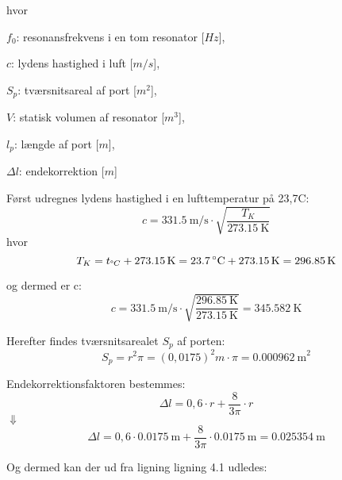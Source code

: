 hvor 
\begin{description}[align=left,labelindent=0.3cm]
\item $f_{0}$: resonansfrekvens i en tom resonator [$Hz$],\\
\item $c$: lydens hastighed i luft [$m/s$],\\
\item $S_{p}$: tværsnitsareal af port [$m^2$],\\
\item $V$: statisk volumen af resonator [$m^3$],\\
\item $l_{p}$: længde af port [$m$],\\
\item $\Delta l$: endekorrektion [$m$]\\
\end{description}

Først udregnes lydens hastighed i en lufttemperatur på 23,7\degree C:
\begin{equation}
		c = {\SI{331,5}{\meter / \second}} \cdot \sqrt{\frac{T_{K}}{\SI{273,15}{\kelvin}}}	\end{equation}
 hvor 		
\begin{equation}
		T_{K} = t_{\degree C} + {\SI{273,15}{\kelvin}} = {\SI{23,7}{\degree C}} + {\SI{273,15}{\kelvin}} = {\SI{296,85}{\kelvin}}	
\end{equation}

og dermed er c: 
\begin{equation}
		c = {\SI{331,5}{\meter / \second}} \cdot \sqrt{\frac{\SI{296,85}{\kelvin}}{\SI{273,15}{\kelvin}}} = {\SI{345,582}{\kelvin}}	\end{equation}
		
Herefter findes tværsnitsarealet $S_{p}$ af porten:
\begin{equation}
		S_{p} = r^2\pi = (0,0175)^2 m \cdot \pi	= {\SI{0,000962}{\meter}^2}
\end{equation}

Endekorrektionsfaktoren bestemmes: 
\begin{equation}
		\Delta l = 0,6 \cdot r + \frac{8}{3\pi} \cdot r 
\end{equation} 
$\Downarrow$
\begin{equation}
\Delta l = 0,6 \cdot {\SI{0,0175}{\meter}} + \frac{8}{3\pi} \cdot {\SI{0,0175}{\meter}} = {\SI{0.025354}{\meter}} 
\end{equation}
		
Og dermed kan der ud fra ligning ligning 4.1 udledes: 

